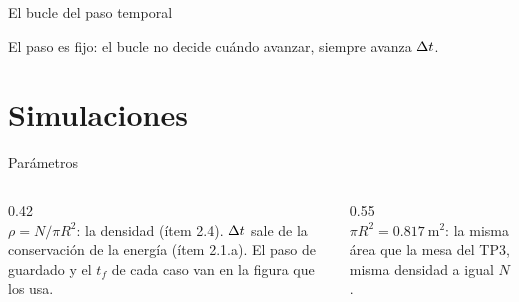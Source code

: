 \documentclass[aspectratio=169,11pt]{beamer}
\begin{document}
\begin{frame}{El bucle del paso temporal}
    \vspace{0.2em}
    \begin{center}
        
    \end{center}
    \vspace{-0.1em}
    \centering
    {\small El paso es \alert{fijo}: el bucle no decide cuándo avanzar, siempre avanza $\Delta t$.}
\end{frame}

\section{Simulaciones}

\begin{frame}{Parámetros}
    \begin{columns}[c,onlytextwidth]
        \begin{column}{0.42\textwidth}
            \\[0.25em]
            {\scriptsize\color{gris}\sloppy $\rho = N/\pi R^2$: la densidad
             (ítem 2.4). $\Delta t$ sale de la conservación de la energía (ítem 2.1.a).
             El paso de guardado y el $t_f$ de cada caso van en la figura que
             los usa.}
        \end{column}\hfill
        \begin{column}{0.55\textwidth}
            \centering
            \\[0.3em]
            {\footnotesize\color{gris} $\pi R^2 = \SI{0.817}{\meter\squared}$:
             la misma área que la mesa del TP3, misma densidad a igual $N$.}
        \end{column}
    \end{columns}
\end{frame}
\end{document}
